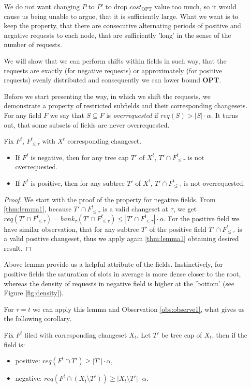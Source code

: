 We do not want changing $P$ to $P'$ to drop $cost_{\mathrm{OPT}}$ value too 
much, so it would cause us being unable to argue, that it is sufficiently large.
What we want is to keep the property, that there are consecutive alternating
periods of positive and negative requests to each node, that are sufficiently
'long' in the sense of the number of requests. 

We will show that we can perform shifts within fields in such way, 
that the requests are exactly (for negative requests) or approximately (for 
positive 
requests) evenly distributed and consequently we can lower bound \textbf{OPT}.

Before we start presenting the way, in which we shift the requests, we
demonstrate a property of restricted subfields and their corresponding changesets.
For any field $F$ we say that $S \subseteq F$ is \textit{overrequested}
if $req(S) > |S| \cdot \alpha$. It turns out, that some subsets of fields
are never overrequested.
\begin{lemma}
Fix $F^t$, $F^t_{\leq \tau}$ with $X^t$ corresponding changeset.
\begin{itemize}
 \item If $F^t$ is negative, then for any tree cap $T'$ of $X^t$, $T' \cap 
F^t_{\leq \tau}$ is not overrequested.
\item If $F^t$ is positive, then for any subtree $T'$ of $X^t$, $T'\cap F^t_{\leq \tau}$ is not 
overrequested.
\end{itemize}
\label{thm:not_over_requested}
\end{lemma}
\begin{proof}
We start with the proof of the property for negative fields. 
From \ref{thm:lemma1}, because $T' \cap  F^t_{\leq \tau}$ is a valid 
changeset at $\tau$, we get $req(T' \cap  F^t_{\leq \tau}) = bank_{\tau}(T' 
\cap F^t_{\leq \tau}) \leq |T' \cap F^t_{\leq \tau}| \cdot \alpha$. For the positive
field we have similar observation, that for any subtree $T'$ of the positive field
$T'\cap F^t_{\leq \tau}$ is a valid positive changeset, thus we apply again
\ref{thm:lemma1} obtaining desired result.
\end{proof}

Above lemma provide us a helpful attribute of the fields. Instinctively, for positive 
fields the saturation of slots in average is more dense closer to 
the root, whereas the density of requests in negative field is higher at the 
'bottom' (see Figure \ref{fig:density}).

For $\tau = t$ we can apply this lemma and Observation \ref{obs:observe1}, 
what gives us the following corollary.
\begin{corollary}
Fix $F^t$ filed with corresponding changeset $X_t$. Let $T'$ be tree cap of 
$X_t$, then if the field is:
 \begin{itemize}
  \item positive: $req(F^t \cap T') \geq |T'| \cdot \alpha$,
  \item negative: $req(F^t \cap (X_t \setminus T')) \geq |X_t \setminus 
T'| \cdot \alpha$.
 \end{itemize}
 \label{thm:proper_at_t}
\end{corollary}

